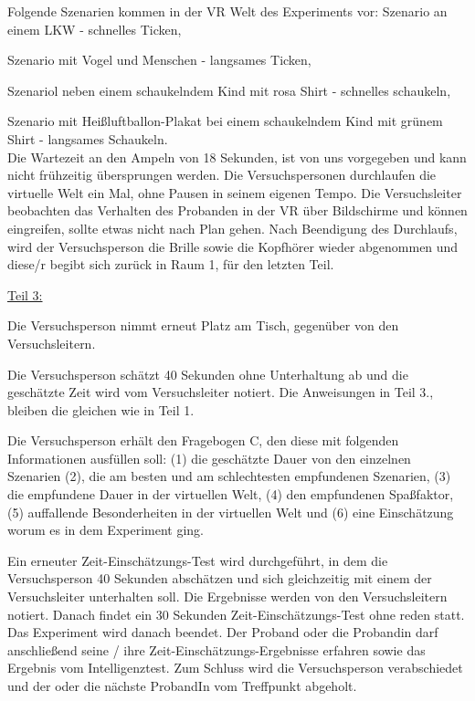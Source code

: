 \documentclass{Bericht}
\begin{document}
Folgende Szenarien kommen in der VR Welt des Experiments vor:
Szenario an einem LKW - schnelles Ticken,

Szenario mit Vogel und Menschen - langsames Ticken,

Szenariol neben einem schaukelndem Kind mit rosa Shirt - schnelles schaukeln,

Szenario mit Heißluftballon-Plakat bei einem schaukelndem Kind mit grünem Shirt - langsames Schaukeln. \\

Die Wartezeit an den Ampeln von 18 Sekunden, ist von uns vorgegeben und kann nicht frühzeitig übersprungen werden. Die Versuchspersonen durchlaufen die virtuelle Welt ein Mal, ohne Pausen in seinem eigenen Tempo. Die Versuchsleiter beobachten das Verhalten des Probanden in der VR über Bildschirme und können eingreifen, sollte etwas nicht nach Plan gehen. Nach Beendigung des Durchlaufs, wird der Versuchsperson die Brille sowie die Kopfhörer wieder abgenommen und diese/r begibt sich zurück in \glqq Raum 1\grqq{}, für den letzten Teil.

\underline{Teil 3:}

Die Versuchsperson nimmt erneut Platz am Tisch, gegenüber von den Versuchsleitern. 

Die Versuchsperson schätzt 40 Sekunden ohne Unterhaltung ab und die geschätzte Zeit wird vom Versuchsleiter notiert. Die Anweisungen in Teil 3., bleiben die gleichen wie in Teil 1.

Die Versuchsperson erhält den \glqq Fragebogen C\grqq{}, den diese mit folgenden Informationen ausfüllen soll:  (1) die geschätzte Dauer von den einzelnen Szenarien (2), die am besten und am schlechtesten empfundenen Szenarien, (3) die empfundene Dauer in der virtuellen Welt, (4) den empfundenen Spaßfaktor, (5) auffallende Besonderheiten in der virtuellen Welt und (6) eine Einschätzung worum es in dem Experiment ging.

Ein erneuter Zeit-Einschätzungs-Test wird durchgeführt, in dem die Versuchsperson 40 Sekunden abschätzen und sich gleichzeitig mit einem der Versuchsleiter unterhalten soll. Die Ergebnisse werden von den Versuchsleitern notiert. Danach findet ein 30 Sekunden Zeit-Einschätzungs-Test ohne reden statt. Das Experiment wird danach beendet. Der Proband oder die Probandin darf anschließend seine / ihre Zeit-Einschätzungs-Ergebnisse erfahren sowie das Ergebnis vom Intelligenztest. Zum Schluss wird die Versuchsperson verabschiedet und der oder die nächste ProbandIn vom Treffpunkt abgeholt.
\end{document}
